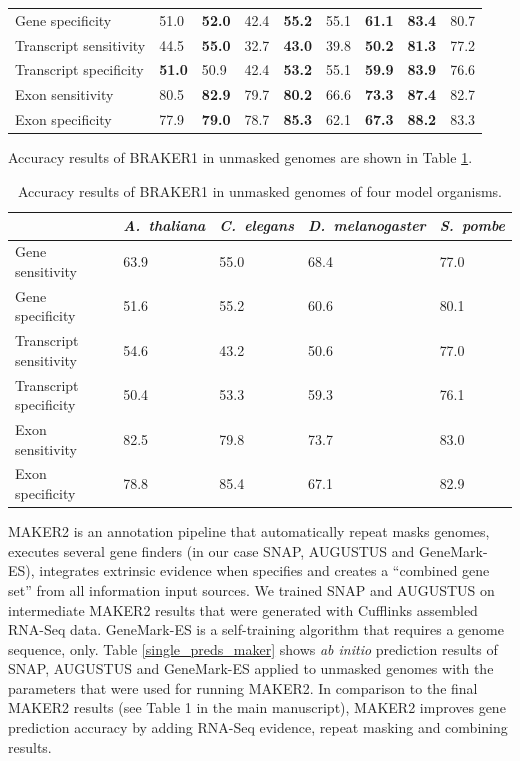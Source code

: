 \documentclass[a4paper,10pt]{report}
\begin{document}
\begin{table}
\begin{tabular}{lp{1.5cm}p{1.2cm}p{1.5cm}p{1.2cm}p{1.5cm}p{1.2cm}p{1.5cm}p{1.2cm}}
Gene specificity        & 51.0 & \textbf{52.0} & 42.4 & \textbf{55.2} & 55.1 & \textbf{61.1} & \textbf{83.4} & 80.7\\
Transcript sensitivity  & 44.5 & \textbf{55.0} & 32.7 & \textbf{43.0} & 39.8 & \textbf{50.2} & \textbf{81.3} & 77.2\\
Transcript specificity  & \textbf{51.0} & 50.9 & 42.4 & \textbf{53.2} & 55.1 & \textbf{59.9} & \textbf{83.9} & 76.6\\
Exon sensitivity        & 80.5 & \textbf{82.9} & 79.7 & \textbf{80.2} & 66.6 & \textbf{73.3} & \textbf{87.4} & 82.7\\
Exon specificity        & 77.9 & \textbf{79.0} & 78.7 & \textbf{85.3} & 62.1 & \textbf{67.3} & \textbf{88.2} & 83.3\\
\hline
\end{tabular}
\end{table}


Accuracy results of BRAKER1 in unmasked genomes are shown in Table \ref{unmasked}.


\begin{table}[h!]
\caption{Accuracy results of BRAKER1 in unmasked genomes of four model organisms. \label{unmasked}}
\begin{tabular}{lp{.9cm}p{.9cm}p{.9cm}p{.9cm}}\hline
 & \multicolumn{1}{c}{\textit{A.~thaliana}} &  \multicolumn{1}{c}{\textit{C.~elegans}} &  \multicolumn{1}{c}{\textit{D.~melanogaster}} &  \multicolumn{1}{c}{\textit{S.~pombe}}\\
 \hline
Gene sensitivity        & 63.9 & 55.0 & 68.4 & 77.0\\
Gene specificity        & 51.6 & 55.2 & 60.6 & 80.1\\
Transcript sensitivity  & 54.6 & 43.2 & 50.6 & 77.0\\
Transcript specificity  & 50.4 & 53.3 & 59.3 & 76.1\\
Exon sensitivity        & 82.5 & 79.8 & 73.7 & 83.0\\
Exon specificity        & 78.8 & 85.4 & 67.1 & 82.9\\
\hline
\end{tabular}
\end{table}

MAKER2 is an annotation pipeline that automatically repeat masks genomes, executes several gene finders (in our case SNAP, AUGUSTUS and GeneMark-ES), integrates extrinsic evidence when specifies and creates a ``combined gene set'' from all information input sources. We trained SNAP and AUGUSTUS on intermediate MAKER2 results that were generated with Cufflinks assembled RNA-Seq data. GeneMark-ES is a self-training algorithm that requires a genome sequence, only. Table \ref{single_preds_maker} shows \textit{ab initio} prediction results of SNAP, AUGUSTUS and GeneMark-ES applied to unmasked genomes with the parameters that were used for running MAKER2. In comparison to the final MAKER2 results (see Table 1 in the main manuscript), MAKER2 improves gene prediction accuracy by adding RNA-Seq evidence, repeat masking and combining results.
\end{document}
